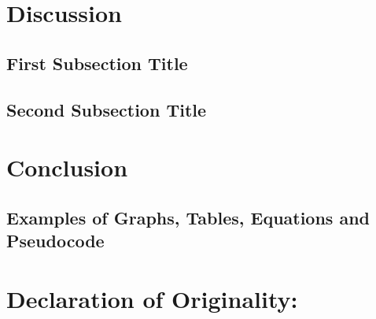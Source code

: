 \documentclass[12pt]{article}
\begin{document}
\begin{spacing}{1.5}
\section{Discussion}

\subsection{First Subsection Title}

\subsection{Second Subsection Title}


\newpage


\section{Conclusion}



\subsection{Examples of Graphs, Tables, Equations and Pseudocode}



\newpage
{}



\newpage
\thispagestyle{empty}
\section*{Declaration of Originality:}


\end{spacing}
\end{document}
